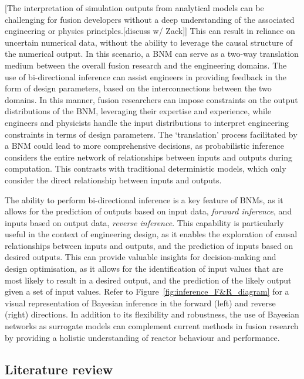 \documentclass[journal]{IEEEtran}
\begin{document}
[The interpretation of simulation outputs from analytical models can be challenging for fusion developers without a deep understanding of the associated engineering or physics principles.[discuss w/ Zack]] This can result in reliance on uncertain numerical data, without the ability to leverage the causal structure of the numerical output. In this scenario, a BNM can serve as a two-way translation medium between the overall fusion research and the engineering domains. The use of bi-directional inference can assist engineers in providing feedback in the form of design parameters, based on the interconnections between the two domains. In this manner, fusion researchers can impose constraints on the output distributions of the BNM, leveraging their expertise and experience, while engineers and physicists handle the input distributions to interpret engineering constraints in terms of design parameters. The `translation' process facilitated by a BNM could lead to more comprehensive decisions, as probabilistic inference considers the entire network of relationships between inputs and outputs during computation. This contrasts with traditional deterministic models, which only consider the direct relationship between inputs and outputs. 

The ability to perform bi-directional inference is a key feature of BNMs, as it allows for the prediction of outputs based on input data, \textit{forward inference}, and inputs based on output data, \textit{reverse inference}. This capability is particularly useful in the context of engineering design, as it enables the exploration of causal relationships between inputs and outputs, and the prediction of inputs based on desired outputs. This can provide valuable insights for decision-making and design optimisation, as it allows for the identification of input values that are most likely to result in a desired output, and the prediction of the likely output given a set of input values. Refer to Figure~\ref{fig:inference_F&R_diagram} for a visual representation of Bayesian inference in the forward (left) and reverse (right) directions. In addition to its flexibility and robustness, the use of Bayesian networks as surrogate models can complement current methods in fusion research by providing a holistic understanding of reactor behaviour and performance. 
    
\subsection{Literature review}~\label{sec:background}
\end{document}
